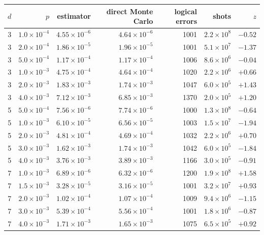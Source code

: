 \begin{tabular}{rrrrrrr}\hline\hline
$d$ & $p$ & estimator & direct Monte Carlo & logical errors & shots & $z$\\\hline
3 & $1.0\times10^{-4}$ & $4.55\times10^{-6}$ & $4.64\times10^{-6}$ & 1001 & $2.2\times10^{8}$ & $-0.52$\\
3 & $2.0\times10^{-4}$ & $1.86\times10^{-5}$ & $1.96\times10^{-5}$ & 1001 & $5.1\times10^{7}$ & $-1.37$\\
3 & $5.0\times10^{-4}$ & $1.17\times10^{-4}$ & $1.17\times10^{-4}$ & 1006 & $8.6\times10^{6}$ & $-0.04$\\
3 & $1.0\times10^{-3}$ & $4.75\times10^{-4}$ & $4.64\times10^{-4}$ & 1020 & $2.2\times10^{6}$ & $+0.66$\\
3 & $2.0\times10^{-3}$ & $1.83\times10^{-3}$ & $1.74\times10^{-3}$ & 1047 & $6.0\times10^{5}$ & $+1.43$\\
3 & $4.0\times10^{-3}$ & $7.12\times10^{-3}$ & $6.85\times10^{-3}$ & 1370 & $2.0\times10^{5}$ & $+1.20$\\
5 & $5.0\times10^{-4}$ & $7.56\times10^{-6}$ & $7.74\times10^{-6}$ & 1000 & $1.3\times10^{8}$ & $-0.64$\\
5 & $1.0\times10^{-3}$ & $6.10\times10^{-5}$ & $6.56\times10^{-5}$ & 1003 & $1.5\times10^{7}$ & $-1.94$\\
5 & $2.0\times10^{-3}$ & $4.81\times10^{-4}$ & $4.69\times10^{-4}$ & 1032 & $2.2\times10^{6}$ & $+0.70$\\
5 & $3.0\times10^{-3}$ & $1.62\times10^{-3}$ & $1.74\times10^{-3}$ & 1042 & $6.0\times10^{5}$ & $-1.84$\\
5 & $4.0\times10^{-3}$ & $3.76\times10^{-3}$ & $3.89\times10^{-3}$ & 1166 & $3.0\times10^{5}$ & $-0.91$\\
7 & $1.0\times10^{-3}$ & $6.89\times10^{-6}$ & $6.32\times10^{-6}$ & 1200 & $1.9\times10^{8}$ & $+1.58$\\
7 & $1.5\times10^{-3}$ & $3.28\times10^{-5}$ & $3.16\times10^{-5}$ & 1001 & $3.2\times10^{7}$ & $+0.93$\\
7 & $2.0\times10^{-3}$ & $1.02\times10^{-4}$ & $1.07\times10^{-4}$ & 1009 & $9.4\times10^{6}$ & $-1.15$\\
7 & $3.0\times10^{-3}$ & $5.39\times10^{-4}$ & $5.56\times10^{-4}$ & 1001 & $1.8\times10^{6}$ & $-0.87$\\
7 & $4.0\times10^{-3}$ & $1.71\times10^{-3}$ & $1.65\times10^{-3}$ & 1075 & $6.5\times10^{5}$ & $+0.92$\\
\hline\hline
\end{tabular}
